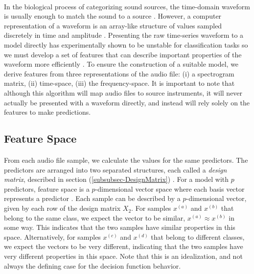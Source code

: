 \documentclass[12pt,letterpaper]{article}
\begin{document}
\paragraph*{}In the biological process of categorizing sound sources, the time-domain waveform is usually enough to match the sound to a source \cite{Olson}. However, a computer representation of a waveform is an array-like structure of values sampled discretely in time and amplitude \cite{Virtanen,Liu}. Presenting the raw time-series waveform to a model directly has experimentally shown to be unstable for classification tasks so we must develop a set of features that can describe important properties of the waveform more efficiently \cite{Goodfellow,James,Serizel}. To ensure the construction of a suitable model, we derive features from three representations of the audio file: (i) a spectrogram matrix, (ii) time-space, (iii) the frequency-space. It is important to note that although this algorithm will map audio files to source instruments, it will never actually be presented with a waveform directly, and instead will rely solely on the features to make predictions.


\subsection{Feature Space}

\paragraph*{}From each audio file sample, we calculate the values for the same predictors. The predictors are arranged into two separated structures, each called a \textit{design matrix}, described in section (\ref{subsubsec-DesignMatrix}) \cite{Goodfellow,Geron}. For a model with $p$ predictors, feature space is a $p$-dimensional vector space where each basis vector represents a predictor \cite{Goodfellow,James}. Each sample can be described by a $p$-dimensional vector, given by each row of the design matrix $X_2$. For samples $x^{(a)}$ and $x^{(b)}$ that belong to the same class, we expect the vector to be similar, $x^{(a)} \approx x^{(b)}$ in some way. This indicates that the two samples have similar properties in this space. Alternatively, for samples $x^{(c)}$ and $x^{(d)}$ that belong to different classes, we expect the vectors to be very different, indicating that the two samples have very different properties in this space. Note that this is an idealization, and not always the defining case for the decision function behavior.
\end{document}
